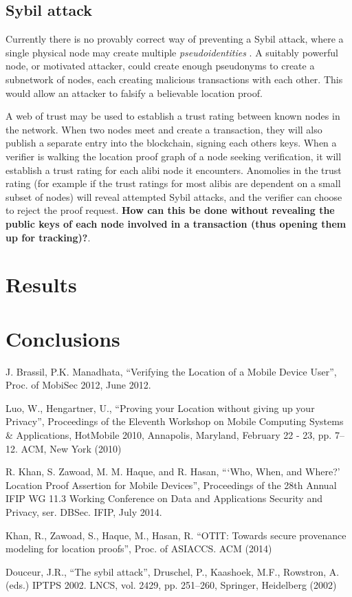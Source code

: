 \documentclass[12pt]{article}
\begin{document}
\subsection{Sybil attack}
Currently there is no provably correct way of preventing a Sybil attack, where a single physical node may create multiple \textit{pseudoidentities} \cite{sybil}. A suitably powerful node, or motivated attacker, could create enough pseudonyms to create a subnetwork of nodes, each creating malicious transactions with each other. This would allow an attacker to falsify a believable location proof.

A web of trust may be used to establish a trust rating between known nodes in the network. When two nodes meet and create a transaction, they will also publish a separate entry into the blockchain, signing each others keys. When a verifier is walking the location proof graph of a node seeking verification, it will establish a trust rating for each alibi node it encounters. Anomolies in the trust rating (for example if the trust ratings for most alibis are dependent on a small subset of nodes) will reveal attempted Sybil attacks, and the verifier can choose to reject the proof request. \textbf{How can this be done without revealing the public keys of each node involved in a transaction (thus opening them up for tracking)?}.

\section{Results}

\section{Conclusions}

\begin{thebibliography}{9}

  J. Brassil, P.K. Manadhata,
  ``Verifying the Location of a Mobile Device User'',
  Proc. of MobiSec 2012,
  June 2012.

  Luo, W., Hengartner, U.,
  ``Proving your Location without giving up your Privacy'',
  Proceedings of the Eleventh Workshop on Mobile Computing Systems \& Applications,
  HotMobile 2010, Annapolis, Maryland, February 22 - 23, pp. 7–12. ACM,
  New York (2010)

  R. Khan, S. Zawoad, M. M. Haque, and R. Hasan,
  ```Who, When, and Where?' Location Proof Assertion for Mobile Devices'',
  Proceedings of the 28th Annual IFIP WG 11.3 Working Conference on Data and Applications Security and Privacy, ser. DBSec. IFIP,
  July 2014.
 
  Khan, R., Zawoad, S., Haque, M., Hasan, R.
  ``OTIT: Towards secure provenance modeling for location proofs'',
  Proc. of ASIACCS. ACM (2014)

  Douceur, J.R.,
  ``The sybil attack'',
  Druschel, P., Kaashoek, M.F., Rowstron, A. (eds.) IPTPS 2002. LNCS, vol. 2429, pp. 251–260,
  Springer, Heidelberg (2002)

\end{thebibliography}
\end{document}

